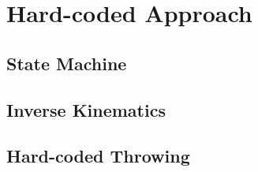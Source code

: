 \section{Hard-coded Approach}

\subsection{State Machine}
\todo{}

\subsection{Inverse Kinematics}

\subsection{Hard-coded Throwing}
\todo{}